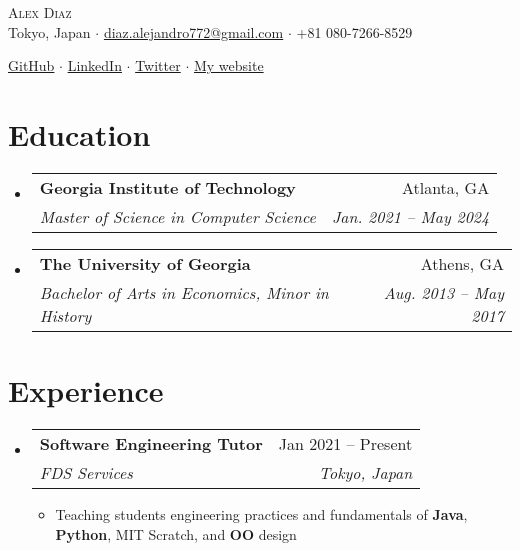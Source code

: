 \documentclass[12pt, letterpaper]{article}
\makeatletter
\newcommand{\resumeItem}[1]{
  \item\small{
    {#1 \vspace{-2pt}}
  }
}
\newcommand{\resumeSubheading}[4]{
  \vspace{-2pt}\item
    \begin{tabular*}{0.97\textwidth}[t]{l@{\extracolsep{\fill}}r}
      \textbf{#1} & #2 \\
      \textit{\small#3} & \textit{\small #4} \\
    \end{tabular*}\vspace{-7pt}
}
\newcommand{\resumeSubHeadingListStart}{\begin{itemize}[leftmargin=0.15in, label={}]}
\newcommand{\resumeSubHeadingListEnd}{\end{itemize}}
\newcommand{\resumeItemListStart}{\begin{itemize}} %
\newcommand{\resumeItemListEnd}{\end{itemize}\vspace{-16pt}}
\makeatother
\begin{document}
    

\vspace*{-12pt}
\begin{center}
	{\Huge \scshape {Alex Diaz}}\\
	\vspace{1mm}
	\faMapMarker \hspace{.5mm} Tokyo, Japan $\cdot$ 
	\faEnvelope \hspace{.5mm} \href{mailto:diaz.alejandro772@gmail.com}{diaz.alejandro772@gmail.com} $\cdot$ \faMobile \hspace{.5mm} +81 080-7266-8529
		
	\faGithub \hspace{.5mm} \href{https://github.com/calmcoconut}{GitHub} $\cdot$
	\faLinkedin \hspace{.5mm} \href{https://www.linkedin.com/in/diazjalejandro/}{LinkedIn} $\cdot$
	\faTwitter \hspace{.5mm} \href{https://twitter.com/greetingsfriend}{Twitter} $\cdot$
    \faBriefcase \hspace{.5mm} \href{https://calmcoconut.github.io/diasDiaz/}{My website}
    \\
\end{center}


\section{Education}
  \resumeSubHeadingListStart
    \resumeSubheading
      {Georgia Institute of Technology}{Atlanta, GA}
      {Master of Science in Computer Science}{Jan. 2021 -- May 2024}
    \resumeSubheading
      {The University of Georgia}{Athens, GA}
      {Bachelor of Arts in Economics, Minor in History}{Aug. 2013 -- May 2017}
 \resumeSubHeadingListEnd

\section{Experience}

\resumeSubHeadingListStart
  \resumeSubheading
    {Software Engineering Tutor}{Jan 2021 -- Present}
    {FDS Services}{Tokyo, Japan}
    \resumeItemListStart
      \resumeItem{Teaching students engineering practices and fundamentals of \textbf{Java}, \textbf{Python}, MIT Scratch, and \textbf{OO} design}
    \resumeItemListEnd
    \resumeSubHeadingListEnd
\end{document}
